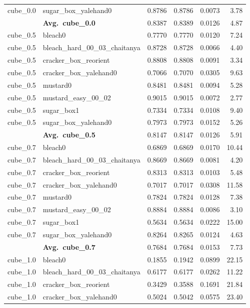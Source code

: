 \begin{longtable}{llrrrr}
  cube_0.0 & sugar\_box\_yalehand0 & 0.8786 & 0.8786 & 0.0073 & 3.78 \\
  \cmidrule{2-6}
  & \textbf{Avg.~cube_0.0} & 0.8387 & 0.8389 & 0.0126 & 4.87 \\
  \midrule
  cube_0.5 & bleach0 & 0.7770 & 0.7770 & 0.0120 & 7.24 \\
  cube_0.5 & bleach\_hard\_00\_03\_chaitanya & 0.8728 & 0.8728 & 0.0066 & 4.40 \\
  cube_0.5 & cracker\_box\_reorient & 0.8808 & 0.8808 & 0.0091 & 3.34 \\
  cube_0.5 & cracker\_box\_yalehand0 & 0.7066 & 0.7070 & 0.0305 & 9.63 \\
  cube_0.5 & mustard0 & 0.8481 & 0.8481 & 0.0094 & 5.28 \\
  cube_0.5 & mustard\_easy\_00\_02 & 0.9015 & 0.9015 & 0.0072 & 2.77 \\
  cube_0.5 & sugar\_box1 & 0.7334 & 0.7334 & 0.0108 & 9.40 \\
  cube_0.5 & sugar\_box\_yalehand0 & 0.7973 & 0.7973 & 0.0152 & 5.26 \\
  \cmidrule{2-6}
  & \textbf{Avg.~cube_0.5} & 0.8147 & 0.8147 & 0.0126 & 5.91 \\
  \midrule
  cube_0.7 & bleach0 & 0.6869 & 0.6869 & 0.0170 & 10.44 \\
  cube_0.7 & bleach\_hard\_00\_03\_chaitanya & 0.8669 & 0.8669 & 0.0081 & 4.20 \\
  cube_0.7 & cracker\_box\_reorient & 0.8313 & 0.8313 & 0.0103 & 5.48 \\
  cube_0.7 & cracker\_box\_yalehand0 & 0.7017 & 0.7017 & 0.0308 & 11.58 \\
  cube_0.7 & mustard0 & 0.7824 & 0.7824 & 0.0128 & 7.38 \\
  cube_0.7 & mustard\_easy\_00\_02 & 0.8884 & 0.8884 & 0.0086 & 3.10 \\
  cube_0.7 & sugar\_box1 & 0.5634 & 0.5634 & 0.0222 & 15.00 \\
  cube_0.7 & sugar\_box\_yalehand0 & 0.8264 & 0.8265 & 0.0124 & 4.63 \\
  \cmidrule{2-6}
  & \textbf{Avg.~cube_0.7} & 0.7684 & 0.7684 & 0.0153 & 7.73 \\
  \midrule
  cube_1.0 & bleach0 & 0.1855 & 0.1942 & 0.0899 & 22.15 \\
  cube_1.0 & bleach\_hard\_00\_03\_chaitanya & 0.6177 & 0.6177 & 0.0262 & 11.22 \\
  cube_1.0 & cracker\_box\_reorient & 0.3429 & 0.3588 & 0.1691 & 21.84 \\
  cube_1.0 & cracker\_box\_yalehand0 & 0.5024 & 0.5042 & 0.0575 & 23.40 \\

\end{longtable}
